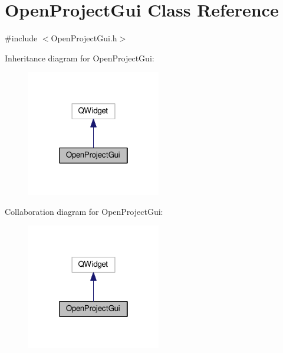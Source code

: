 \hypertarget{class_open_project_gui}{\section{Open\-Project\-Gui Class Reference}
\label{class_open_project_gui}
}


{\ttfamily \#include $<$Open\-Project\-Gui.\-h$>$}



Inheritance diagram for Open\-Project\-Gui\-:\nopagebreak
\begin{figure}[H]
\begin{center}
\leavevmode
\includegraphics[width=166pt]{class_open_project_gui__inherit__graph}
\end{center}
\end{figure}


Collaboration diagram for Open\-Project\-Gui\-:\nopagebreak
\begin{figure}[H]
\begin{center}
\leavevmode
\includegraphics[width=166pt]{class_open_project_gui__coll__graph}
\end{center}
\end{figure}
